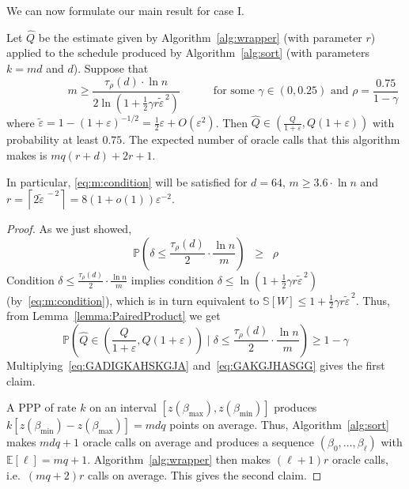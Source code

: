 \documentclass[final,12pt]{colt2018}
\def\bmin{{\beta_{\min}}}
\def\bmax{{\beta_{\max}}}
\def\E{{\mathbb E}}
\def\P{{\mathbb P}}
\def\Vrel(#1){{{\mathbb S}[{#1}]}}
\begin{document}
We can now formulate our main result for case I.
\begin{theorem} \label{th:main}
Let $\hat Q$ be the estimate given by Algorithm~\ref{alg:wrapper} (with parameter $r$)
applied to the schedule produced by Algorithm~\ref{alg:sort} (with parameters $k=md$ and $d$).
Suppose that
\begin{equation}
\hspace{60pt}m \ge \frac{\tau_\rho(d)\cdot \ln n}{2 \ln\left(\mbox{$1+\frac{1}{2}$}\gamma  r\tilde\varepsilon^{\,2}\right)}
\qquad\quad\mbox{for some }\gamma\in(0,0.25)\mbox{ and $\rho=\frac{0.75}{1-\gamma}$}
\label{eq:m:condition}
\end{equation}
where $\tilde\varepsilon=1-(1+\varepsilon)^{-1/2}=\frac{1}{2}\varepsilon + O(\varepsilon^2)$. %
Then $\hat Q\in(\frac{Q}{1+\varepsilon},Q(1+\varepsilon))$ with probability at least $0.75$.
The expected number of oracle calls that this algorithm makes is $mq(r+d)+2r+1$. %

In particular, \eqref{eq:m:condition} will be satisfied for
$d=64$,
$m\ge 3.6 \cdot \ln n$
and
$
r=\left\lceil 2\tilde\varepsilon^{\,-2}\right\rceil=8(1+o(1))\varepsilon^{-2}
$.
\end{theorem}










\begin{proof}
As we just showed,
\begin{equation}
\mbox{$\P\left(\delta\le \frac{\tau_\rho(d)}2\cdot\frac{\ln n}{m}\right)$}\;\;\ge\;\;\rho\label{eq:GADIGKAHSKGJA}
\end{equation}
Condition $\delta\le \frac{\tau_\rho(d)}2\cdot\frac{\ln n}{m}$ implies condition $\delta\le \ln\left(\mbox{$1+\frac{1}{2}$}\gamma  r\tilde\varepsilon^{\,2}\right)$  (by~\eqref{eq:m:condition}),
which is in turn equivalent to $\Vrel(W) \le 1+\frac{1}{2}\gamma r\tilde\varepsilon^{\,2}$.
Thus, from Lemma~\ref{lemma:PairedProduct} we get
\begin{equation}
\mbox{$\P\left(\hat Q\in(\frac{Q}{1+\varepsilon},Q(1+\varepsilon))\;|\;\delta\le \frac{\tau_\rho(d)}2\cdot\frac{\ln n}{m}\right)\ge 1-\gamma$} \label{eq:GAKGJHASGG}
\end{equation}
Multiplying~\eqref{eq:GADIGKAHSKGJA} and~\eqref{eq:GAKGJHASGG} gives the first claim.

A PPP of rate $k$ on an interval $[z(\bmax),z(\bmin)]$ produces $k[z(\bmin)-z(\bmax)]=mdq$ points on average.
Thus, Algorithm~\ref{alg:sort} makes $mdq+1$ oracle calls on average and produces a sequence $(\beta_0,\ldots,\beta_\ell)$ 
with $\E[\ell]=mq+1$. Algorithm~\ref{alg:wrapper} then makes $(\ell+1) r$ oracle calls, i.e.\ $(mq+2)r$ calls on average.
This gives the second claim. 
\end{proof}
\end{document}
